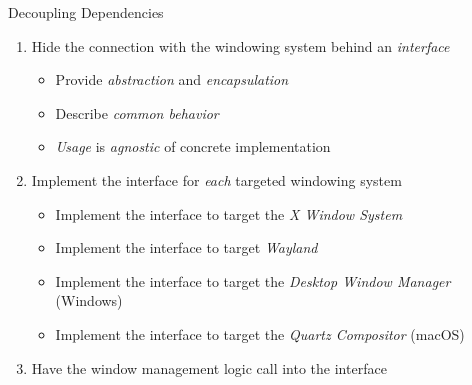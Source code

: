 \begin{secframe}{Decoupling Dependencies}


    \begin{enumerate}

        \item Hide the connection with the windowing system behind an \textit{interface}\\
            \begin{itemize}
                \item Provide \textit{abstraction} and \textit{encapsulation}
                \item Describe \textit{common behavior}
                \item \textit{Usage} is \textit{agnostic} of concrete implementation
            \end{itemize}

        \item Implement the interface for \textit{each} targeted windowing system\\
            \begin{itemize}
                \item Implement the interface to target the \textit{X Window System}
                \item Implement the interface to target \textit{Wayland}
                \item Implement the interface to target the \textit{Desktop Window Manager} (Windows)
                \item Implement the interface to target the \textit{Quartz Compositor} (macOS)
            \end{itemize}

        \item Have the window management logic call into the interface\\

    \end{enumerate}

    \vfill

\end{secframe}

